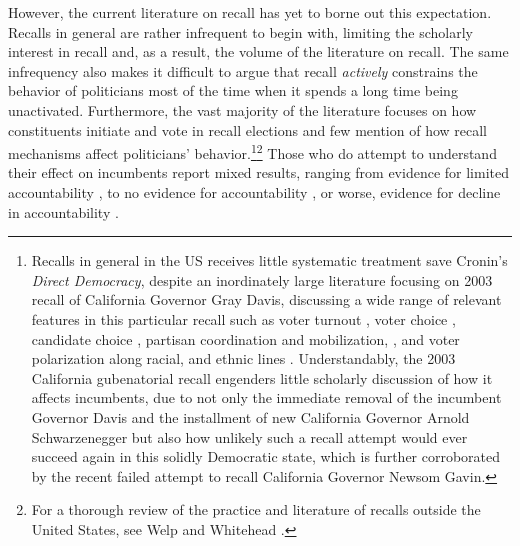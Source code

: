 \documentclass[hyphens, crop=false]{standalone}
\begin{document}
	However, the current literature on recall has yet to borne out this expectation.
	Recalls in general are rather infrequent to begin with,
	limiting the scholarly interest in recall and, as a result, the volume of the literature on recall.
	The same infrequency also makes it difficult to argue 
	that recall
	\textit
	{
		actively
	}
	constrains 
	the
	behavior of politicians 
	most of the time when it spends a long time being unactivated.
	Furthermore, the vast majority of the literature focuses on how 
	constituents initiate and vote in recall elections and 
	few mention of how recall mechanisms affect politicians' behavior.\footnote
	{
		Recalls in general in the US receives little systematic treatment save Cronin's
		\autocite{croninDirectDemocracyPolitics1989}
		\textit{Direct Democracy}, despite an inordinately large literature focusing on 2003 recall of California Governor Gray Davis, 
		discussing a wide range of relevant features in this particular recall such as 
		voter turnout
		\autocite{arbourVoterTurnoutCalifornia2005},
		voter choice 
		\autocite{alvarezRationalityRationalisticChoice2009,shawStrategicVotingCalifornia2005},
		candidate choice
		\autocite{mcgheeRoleCandidateChoice2009},
		partisan coordination and mobilization,
		\autocite{masketCaliforniaRecallSprint2016},
		and
		voter polarization along
		racial, and ethnic
		lines
		\autocite{seguraRaceRecallRacial2008}.
		Understandably, the 2003 California gubenatorial recall engenders little scholarly
		discussion of how it affects incumbents, 
		due to not only the immediate removal of the incumbent Governor Davis and 
		the
		installment of new California Governor Arnold Schwarzenegger
		but also 
		how unlikely such a recall attempt
		would ever succeed again in this solidly Democratic state,
		which is further corroborated by the recent failed attempt to recall California Governor Newsom Gavin.
	}\footnote
	{
		For a thorough review of the practice and literature of recalls outside the United States,
		see Welp and Whitehead \autocite*{welpPoliticsRecallElections2020}.
	}
	Those who do attempt to understand their effect on incumbents report mixed results, 
	ranging from evidence for limited accountability
	\autocite{okamotoRecallJapanMeasure2020},
	to
	no evidence for accountability
	\autocite{welpRecallReferendumsPeruvian2016},
	or worse,
	evidence for decline in accountability
	\autocite{hamanRecallElectionsTool2021}.
	
\end{document}
